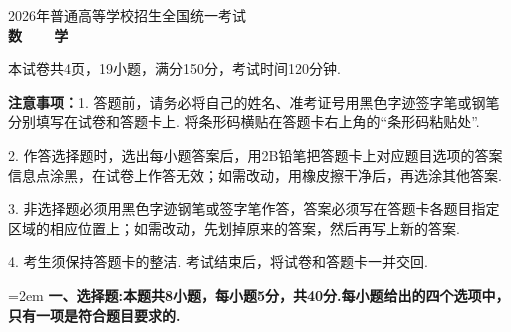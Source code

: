 \documentclass[12pt,a4paper]{article}
\begin{document}
	
	
	\vspace*{0.5cm}
	
	\begin{center}
		{\Large 2026年普通高等学校招生全国统一考试}\\[0.8cm]
		{\LARGE\bfseries 数~~~~学}
	\end{center}
	
	\noindent 本试卷共4页，19小题，满分150分，考试时间120分钟.
	
	\noindent\hangindent=73pt {\bfseries 注意事项：}1. 答题前，请务必将自己的姓名、准考证号用黑色字迹签字笔或钢笔分别填写在试卷和答题卡上.  将条形码横贴在答题卡右上角的“条形码粘贴处”. 
	
	\noindent\hangindent=73pt\hspace{61pt}2. 作答选择题时，选出每小题答案后，用2B铅笔把答题卡上对应题目选项的答案信息点涂黑，在试卷上作答无效；如需改动，用橡皮擦干净后，再选涂其他答案. 
	
	\noindent\hangindent=73pt\hspace{61pt}3. 非选择题必须用黑色字迹钢笔或签字笔作答，答案必须写在答题卡各题目指定区域的相应位置上；如需改动，先划掉原来的答案，然后再写上新的答案. 
	
	\noindent\hangindent=73pt\hspace{61pt}4. 考生须保持答题卡的整洁. 考试结束后，将试卷和答题卡一并交回. 
	
	
	\noindent\hangindent=2em {\bfseries 一、选择题:本题共8小题，每小题5分，共40分.每小题给出的四个选项中，只有一项是符合题目要求的.}
	
\end{document}
